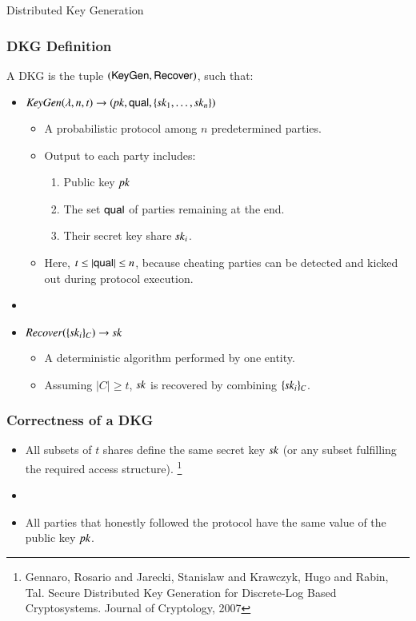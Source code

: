 \documentclass[hyperref={pdfpagelabels=true},table,dvipsnames,14pt,aspectratio=169]{beamer}
\begin{document}
\begin{frame}
  \huge
  \centering
  Distributed Key Generation
\end{frame}

\begin{frame}
  \frametitle{DKG Definition}

  A DKG is the tuple $(\mathsf{KeyGen}, \mathsf{Recover})$, such that:

  \begin{itemize}
    \item<2-> $\mathit{KeyGen}(\lambda, n, t) \rightarrow ( \mathit{pk}, \mathsf{qual}, \{\mathit{sk}_1, \ldots, \mathit{sk}_n \} )$
    \begin{itemize}
      \item<3-> A probabilistic protocol among $n$ predetermined parties.
      \item<4-> Output to each party includes:
    \begin{enumerate}
      \item<5->[1.] Public key $\mathit{pk}$
      \item<6->[2.] The set $\mathsf{qual}$ of parties remaining at the end.
      \item<7->[3.] Their secret key share $\mathit{sk}_i$.
    \end{enumerate}

    \item<8->[2.] Here, $t \leq \lvert \mathsf{qual} \rvert \leq n$, because cheating parties can be detected and kicked out during protocol execution.
    \end{itemize}
    \item[]
    \item<8-> $\mathit{Recover}(\{ \mathit{sk}_i \}_C) \rightarrow \mathit{sk}$
    \begin{itemize}
      \item<9-> A deterministic algorithm performed by one entity.
      \item<10-> Assuming $\lvert C \rvert \geq t$, $\mathit{sk}$ is recovered by combining $\{ \mathit{sk}_i \}_C$.
    \end{itemize}
  \end{itemize}
\end{frame}

\begin{frame}
  \frametitle{Correctness of a DKG}

  \begin{itemize}
    \item<1-> All subsets of $t$ shares define the same secret key $\mathit{sk}$ (or any subset fulfilling the required access structure).
\let\thefootnote\relax\footnote{
Gennaro, Rosario and Jarecki, Stanislaw and Krawczyk, Hugo and Rabin, Tal. Secure Distributed Key Generation for Discrete-Log Based Cryptosystems. Journal of Cryptology, 2007
}
    \item[]
    \item<2-> All parties that honestly followed the protocol have the same value of the public key $\mathit{pk}$.
  \end{itemize}
\end{frame}
\end{document}
